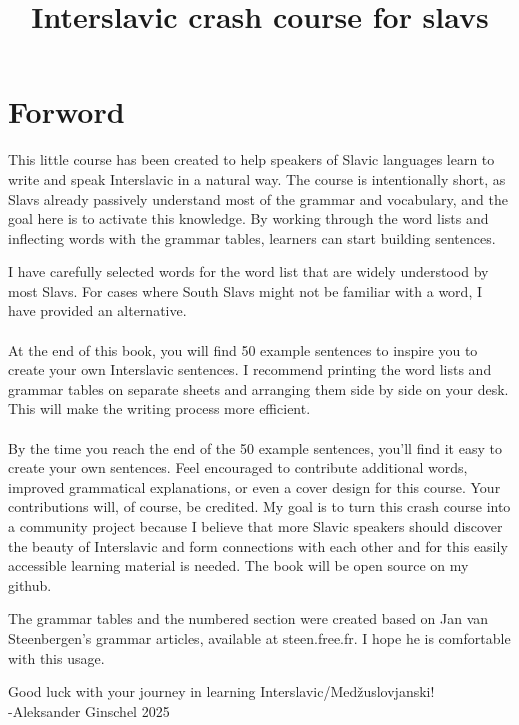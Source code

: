 \documentclass{article}
\title{Interslavic crash course for slavs}
\begin{document}
\maketitle
\newpage
\section{Forword}
This little course has been created to help speakers of Slavic languages learn to write and speak Interslavic in a natural way. The course is intentionally short, as Slavs already passively understand most of the grammar and vocabulary, and the goal here is to activate this knowledge. By working through the word lists and inflecting words with the grammar tables, learners can start building sentences.

I have carefully selected words for the word list that are widely understood by most Slavs. For cases where South Slavs might not be familiar with a word, I have provided an alternative. 
\\ \\
At the end of this book, you will find 50 example sentences to inspire you to create your own Interslavic sentences. I recommend printing the word lists and grammar tables on separate sheets and arranging them side by side on your desk. This will make the writing process more efficient.
\\ \\
By the time you reach the end of the 50 example sentences, you’ll find it easy to create your own sentences. Feel encouraged to contribute additional words, improved grammatical explanations, or even a cover design for this course. Your contributions will, of course, be credited. My goal is to turn this crash course into a community project because I believe that more Slavic speakers should discover the beauty of Interslavic and form connections with each other and for this easily accessible learning material is needed. The book will be open source on my github.

The grammar tables and the numbered section were created based on Jan van Steenbergen’s grammar articles, available at steen.free.fr. I hope he is comfortable with this usage.

Good luck with your journey in learning Interslavic/Medžuslovjanski! \\
-Aleksander Ginschel 2025
\end{document}
